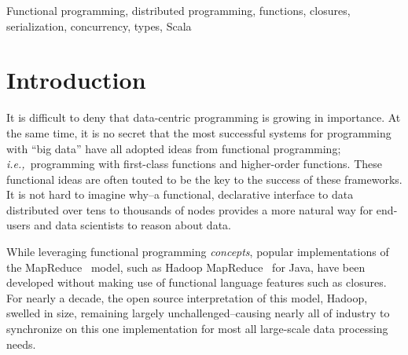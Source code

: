 \documentclass[preprint]{sigplanconf}
\theoremstyle{definition}
\theoremstyle{definition}
\newcommand{\ie}{{\em i.e.,~}}
\begin{document}
\begin{abstract}

\end{abstract}



\keywords
Functional programming, distributed programming, functions, closures,
serialization, concurrency, types, Scala

\section{Introduction}

It is difficult to deny that data-centric programming is growing in importance.
At the same time, it is no secret that the most successful systems for
programming with ``big data'' have all adopted ideas from functional
programming; \ie programming with first-class functions and higher-order
functions. These functional ideas are often touted to be the key to the success
of these frameworks. It is not hard to imagine why--a functional, declarative
interface to data distributed over tens to thousands of nodes provides a more
natural way for end-users and data scientists to reason about data.

While leveraging functional programming {\em concepts}, popular implementations
of the MapReduce~\cite{MapReduce} model, such as Hadoop MapReduce~\cite{Hadoop}
for Java, have been developed without making use of functional language features
such as closures. For nearly a decade, the open source interpretation of this
model, Hadoop, swelled in size, remaining largely unchallenged--causing nearly
all of industry to synchronize on this one implementation for most all
large-scale data processing needs.
\end{document}

